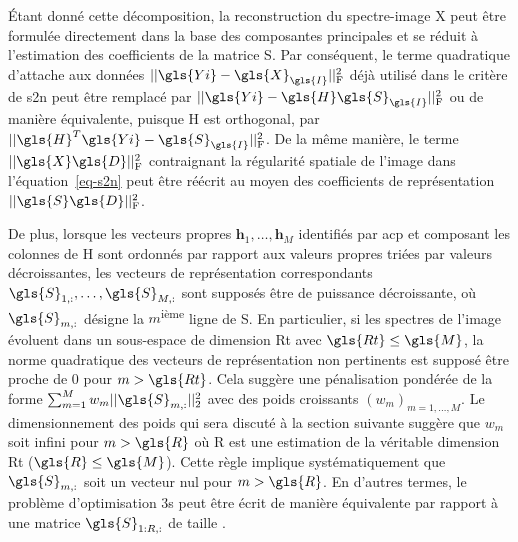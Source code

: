 \'Etant donné cette décomposition, la reconstruction du spectre-image \gls{X} peut être formulée directement dans la base des composantes principales et se réduit à l'estimation des  coefficients de la matrice \gls{S}. Par conséquent, le terme quadratique d'attache aux données $\frobnorm{\gls{Yi} - \gls{X}_{\gls{I}}}$ déjà utilisé dans le critère de \gls{s2n} peut être remplacé par $\frobnorm{\gls{Yi} - \gls{H}\gls{S}_{\gls{I}}}$ ou de manière équivalente, puisque \gls{H} est orthogonal, par $\frobnorm{\gls{H}^T\gls{Yi} - \gls{S}_{\gls{I}}}$. De la même manière, le terme $\frobnorm{\gls{X}\gls{D}}$ contraignant la régularité spatiale de l'image dans l'équation~\eqref{eq-s2n} peut être réécrit au moyen des coefficients de représentation $\frobnorm{\gls{S}\gls{D}}$.

De plus, lorsque les vecteurs propres $\mathbf{h}_1,\dots,\mathbf{h}_M$ identifiés par \gls{acp} et composant les colonnes de \gls{H} sont ordonnés par rapport aux valeurs propres triées par valeurs décroissantes, les vecteurs de représentation correspondants $\gls{S}_{1, :},\dots,\gls{S}_{M, :}$ sont supposés être de puissance décroissante, où $\gls{S}_{m, :}$ désigne la $m$\textsuperscript{ième} ligne de \gls{S}. En particulier, si les spectres de l'image évoluent dans un sous-espace de dimension \gls{Rt} avec $\gls{Rt}\leq\gls{M}$, la norme quadratique des vecteurs de représentation non pertinents est supposé être proche de 0 pour $m>\gls{Rt}$. Cela suggère une pénalisation pondérée de la forme $\sum_{m=1}^{M}w_m||\gls{S}_{m, :}||_2^2$ avec des poids croissants $(w_m)_{m=1,\dots,M}$.
%
Le dimensionnement des poids qui sera discuté à la section suivante suggère que $w_m$ soit infini pour $m>\gls{R}$ où \gls{R} est une estimation de la véritable dimension \gls{Rt} ($\gls{R}\leq\gls{M}$). Cette règle implique systématiquement que $\gls{S}_{m, :}$ soit un vecteur nul pour $m> \gls{R}$. En d'autres termes, le problème d'optimisation \gls{3s} peut être écrit de manière équivalente par rapport à une matrice $\gls{S}_{1:R, :}$ de taille .


